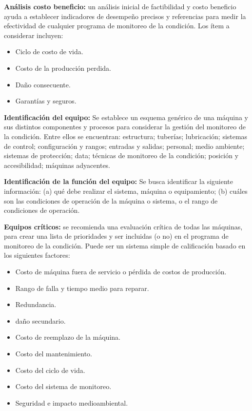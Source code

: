 \begin{description}
\item \textbf{Análisis costo beneficio:} un análisis inicial de factibilidad y costo beneficio ayuda a establecer indicadores de desempeño precisos y referencias para medir la efectividad de cualquier programa de monitoreo de la condición. Los ítem a considerar incluyen:
\begin{itemize}
\item Ciclo de costo de vida.
\item Costo de la producción perdida.
\item Daño consecuente.
\item Garantías y seguros.
\end{itemize}

\item \textbf{Identificación del equipo:} Se establece un esquema genérico de una máquina y sus distintos componentes y procesos para considerar la gestión del monitoreo de la condición. Entre ellos se encuentran: estructura; tuberías; lubricación; sistemas de control; configuración y rangos; entradas y salidas; personal; medio ambiente; sistemas de protección; data; técnicas de monitoreo de la condición; posición y accesibilidad; máquinas adyacentes.

\item \textbf{Identificación de la función del equipo:} Se busca identificar la siguiente información: (a) qué debe realizar el sistema, máquina o equipamiento; (b) cuáles son las condiciones de operación de la máquina o sistema, o el rango de condiciones de operación.

\item \textbf{Equipos críticos:} se recomienda una evaluación crítica de todas las máquinas, para crear una lista de prioridades y ser incluidas (o no) en el programa de monitoreo de la condición. Puede ser un sistema simple de calificación basado en los siguientes factores:

\begin{itemize}
\item Costo de máquina fuera de servicio o pérdida de costos de producción.
\item Rango de falla y tiempo medio para reparar.
\item Redundancia.
\item daño secundario.
\item Costo de reemplazo de la máquina.
\item Costo del mantenimiento.
\item Costo del ciclo de vida.
\item Costo del sistema de monitoreo.
\item Seguridad e impacto medioambiental.
\end{itemize}


\end{description}
